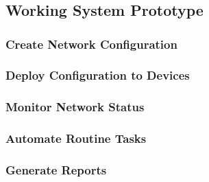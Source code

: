 \chapter{\babSebelas}

\section{Working System Prototype}


\subsection{Create Network Configuration}


\subsection{Deploy Configuration to Devices}

\subsection{Monitor Network Status}

\subsection{Automate Routine Tasks}

\subsection{Generate Reports}


